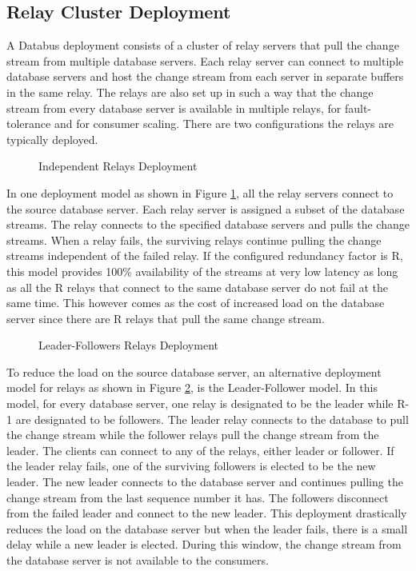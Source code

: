 \subsection{Relay Cluster Deployment}

A Databus deployment consists of a cluster of relay servers that pull the change stream from multiple database servers. Each relay server can connect to multiple database servers and host the change stream from each server in separate buffers in the same relay. The relays are also set up in such a way that the change stream from every database server is available in multiple relays, for fault-tolerance and for consumer scaling. There are two configurations the relays are typically deployed.

\begin{figure}
\centering
{}
\caption{Independent Relays Deployment}
\label{fig:RelayDeployment1}
\end{figure}

In one deployment model as shown in Figure \ref{fig:RelayDeployment1}, all the relay servers connect to the source database server. Each relay server is assigned a subset of the database streams. The relay connects to the specified database servers and pulls the change streams. When a relay fails, the surviving relays continue pulling the change streams independent of the failed relay. If the configured redundancy factor is R, this model provides 100\% availability of the streams at very low latency as long as all the R relays that connect to the same database server do not fail at the same time. This however comes as the cost of increased load on the database server since there are R relays that pull the same change stream.

\begin{figure}
\centering
{}
\caption{Leader-Followers Relays Deployment}
\label{fig:RelayDeployment2}
\end{figure}

To reduce the load on the source database server, an alternative deployment model for relays as shown in Figure \ref{fig:RelayDeployment2}, is the Leader-Follower model. In this model, for every database server, one relay is designated to be the leader while R-1 are designated to be followers. The leader relay connects to the database to pull the change stream while the follower relays pull the change stream from the leader. The clients can connect to any of the relays, either leader or follower. If the leader relay fails, one of the surviving followers is elected to be the new leader. The new leader connects to the database server and continues pulling the change stream from the last sequence number it has. The followers disconnect from the failed leader and connect to the new leader. This deployment drastically reduces the load on the database server but when the leader fails, there is a small delay while a new leader is elected. During this window, the change stream from the database server is not available to the consumers.

